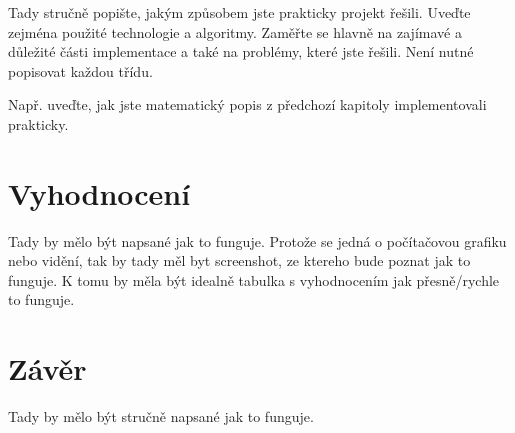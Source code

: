 \documentclass[a4paper, 12pt]{article}
\begin{document}
Tady stručně popište, jakým způsobem jste prakticky projekt řešili. Uveďte zejména použité
technologie a algoritmy. Zaměřte se hlavně na zajímavé a důležité části implementace a také na
problémy, které jste řešili. Není nutné popisovat každou třídu.

Např. uveďte, jak jste matematický popis z předchozí kapitoly implementovali prakticky.



\section{Vyhodnocení}

Tady by mělo být napsané jak to funguje. Protože se jedná o počítačovou grafiku nebo
vidění, tak by tady měl byt screenshot, ze ktereho bude poznat jak to funguje.
K tomu by měla být idealně tabulka s vyhodnocením jak přesně/rychle to funguje.


\section{Závěr}

Tady by mělo být stručně napsané jak to funguje.



\begin{flushleft}
  
\end{flushleft}

\end{document}

